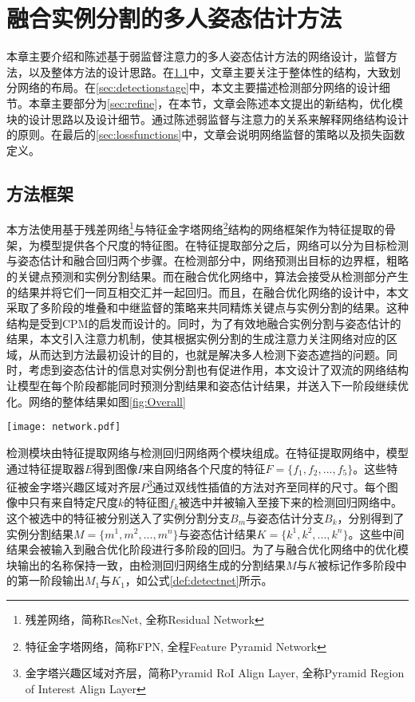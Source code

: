 \chapter{融合实例分割的多人姿态估计方法}
\label{cha:method}
本章主要介绍和陈述基于弱监督注意力的多人姿态估计方法的网络设计，监督方法，以及整体方法的设计思路。在\ref{sec:methodoverview}中，文章主要关注于整体性的结构，大致划分网络的布局。在\ref{sec:detectionstage}中，本文主要描述检测部分网络的设计细节。本章主要部分为\ref{sec:refine}，在本节，文章会陈述本文提出的新结构，优化模块的设计思路以及设计细节。通过陈述弱监督与注意力的关系来解释网络结构设计的原则。在最后的\ref{sec:lossfunctions}中，文章会说明网络监督的策略以及损失函数定义。

\section{方法框架}
\label{sec:methodoverview}
本方法使用基于残差网络\footnote{残差网络，简称ResNet, 全称Residual Network}与特征金字塔网络\footnote{特征金字塔网络，简称FPN, 全程Feature Pyramid Network}结构的网络框架作为特征提取的骨架，为模型提供各个尺度的特征图。在特征提取部分之后，网络可以分为目标检测与姿态估计和融合回归两个步骤。在检测部分中，网络预测出目标的边界框，粗略的关键点预测和实例分割结果。而在融合优化网络中，算法会接受从检测部分产生的结果并将它们一同互相交汇并一起回归。而且，在融合优化网络的设计中，本文采取了多阶段的堆叠和中继监督的策略来共同精炼关键点与实例分割的结果。这种结构是受到CPM\cite{wei2016convolutional}的启发而设计的。同时，为了有效地融合实例分割与姿态估计的结果，本文引入注意力机制，使其根据实例分割的生成注意力关注网络对应的区域，从而达到方法最初设计的目的，也就是解决多人检测下姿态遮挡的问题。同时，考虑到姿态估计的信息对实例分割也有促进作用，本文设计了双流的网络结构让模型在每个阶段都能同时预测分割结果和姿态估计结果，并送入下一阶段继续优化。网络的整体结果如图\ref{fig:Overall}

\begin{figure*}[htbp]	
	\centering
	\texttt{[image: network.pdf]}
	\caption{网络整体结构}
	\label{fig:Overall}
\end{figure*}

检测模块由特征提取网络与检测回归网络两个模块组成。在特征提取网络中，模型通过特征提取器$E$得到图像$I$来自网络各个尺度的特征$F=\{f_1, f_2, ..., f_5\}$。这些特征被金字塔兴趣区域对齐层$P$\footnote{金字塔兴趣区域对齐层，简称Pyramid RoI Align Layer, 全称Pyramid Region of Interest Align Layer}通过双线性插值的方法对齐至同样的尺寸。每个图像中只有来自特定尺度$k$的特征图$f_k$被选中并被输入至接下来的检测回归网络中。这个被选中的特征被分别送入了实例分割分支$B_m$与姿态估计分支$B_k$，分别得到了实例分割结果$M=\{m^1, m^2, ..., m^n\}$与姿态估计结果$K=\{k^1, k^2, ..., k^n\}$。这些中间结果会被输入到融合优化阶段进行多阶段的回归。为了与融合优化网络中的优化模块输出的名称保持一致，由检测回归网络生成的分割结果$M$与$K$被标记作多阶段中的第一阶段输出$M_1$与$K_1$，如公式\eqref{def:detectnet}所示。

